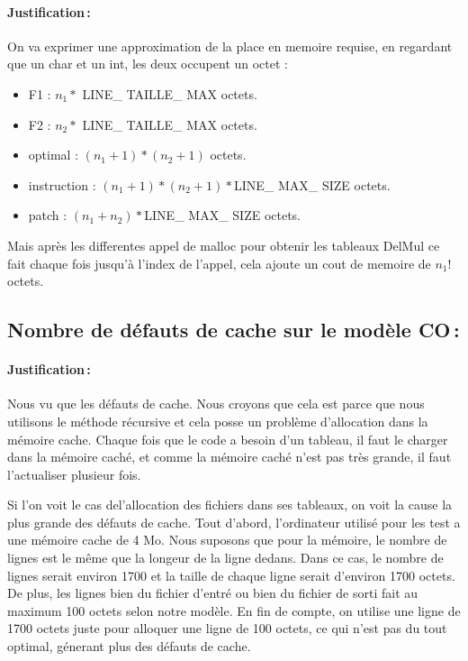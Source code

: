 \documentclass[a4paper, 10pt, french]{article}
\begin{document}
    \paragraph{Justification\,: }

On va exprimer une approximation de la place en memoire requise, en regardant que un char et un int, les deux occupent un octet :

	\begin{itemize}
	\item F1 : $n_1*$ LINE\_ TAILLE\_ MAX octets.
	\item F2 : $n_2*$ LINE\_ TAILLE\_ MAX octets.
	\item optimal : $(n_1+1)*(n_2+1)$ octets. 
	\item instruction : $(n_1+1)*(n_2+1)*$LINE\_ MAX\_ SIZE octets.
	\item patch : $(n_1+n_2)*$LINE\_ MAX\_ SIZE octets.	
	\end{itemize}

Mais après les differentes appel de malloc pour obtenir les tableaux DelMul ce fait chaque fois jusqu'à l'index de l'appel, cela ajoute un cout de memoire de $n_1!$ octets.

  \subsection{Nombre de défauts de cache sur le modèle CO\,: }
    \paragraph{Justification\,: }
    Nous vu que les défauts de cache. Nous croyons que cela est parce que nous utilisons le méthode récursive et cela posse un problème d'allocation dans la mémoire cache. Chaque fois que le code a besoin d'un tableau, il faut le charger dans la mémoire caché, et comme la mémoire caché n'est pas très grande, il faut l'actualiser plusieur fois.
    
    Si l'on voit le cas del'allocation des fichiers dans ses tableaux, on voit la cause la plus grande des défauts de cache. Tout d'abord, l'ordinateur utilisé pour les test a une mémoire cache de 4 Mo. Nous suposons que pour la mémoire, le nombre de lignes est le même que la longeur de la ligne dedans. Dans ce cas, le nombre de lignes serait environ 1700 et la taille de chaque ligne serait d'environ 1700 octets. De plus, les lignes bien du fichier d'entré ou bien du fichier de sorti fait au maximum 100 octets selon notre modèle. En fin de compte, on utilise une ligne de 1700 octets juste pour alloquer une ligne de 100 octets, ce qui n'est pas du tout optimal, génerant plus des défauts de cache.
    
\end{document}
